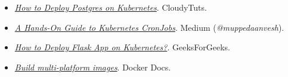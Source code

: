 \documentclass{report}
\begin{document}
\begin{itemize}
            \item \href{https://www.cloudytuts.com/guides/kubernetes/how-to-deploy-postgress-kubernetes/}{\textit{How to Deploy Postgres on Kubernetes}}. CloudyTuts.
            \item \href{https://medium.com/@muppedaanvesh/a-hand-on-guide-to-kubernetes-cronjobs-%EF%B8%8F-47393a98716d}{\textit{A Hands-On Guide to Kubernetes CronJobs}}. Medium (\textit{@muppedaanvesh}).
            \item \href{https://www.geeksforgeeks.org/how-to-deploy-flask-app-on-kubernetes/}{\textit{How to Deploy Flask App on Kubernetes?}}. GeeksForGeeks.
            \item \href{https://docs.docker.com/build/building/multi-platform/#build-multi-platform-images}{\textit{Build multi-platform images}}. Docker Docs.
        \end{itemize}
\end{document}
